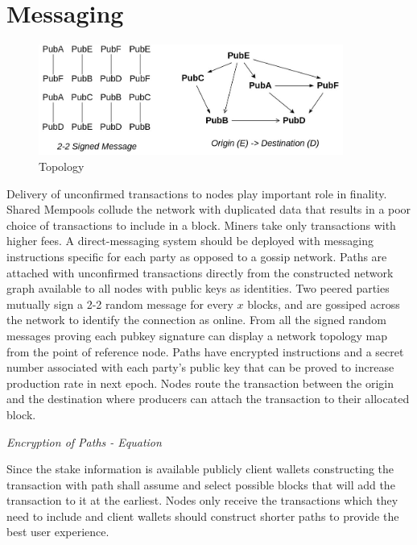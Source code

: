 \documentclass[a4paper,10pt]{article}
\begin{document}
\section{Messaging}
\begin{figure}[H]
\begin{center}
\includegraphics[width=10cm]{topology}
\caption{Topology}
\end{center}
\end{figure}
Delivery of unconfirmed transactions to nodes play important role in finality. Shared Mempools collude the network with duplicated data that results in a poor choice of transactions to include in a block. Miners take only transactions with higher fees. A direct-messaging system should be deployed with messaging instructions specific for each party as opposed to a gossip network. Paths are attached with unconfirmed transactions directly from the constructed network graph available to all nodes with public keys as identities. Two peered parties mutually sign a 2-2 random message for every $x$ blocks, and are gossiped across the network to identify the connection as online. From all the signed random messages proving each pubkey signature can display a network topology map from the point of reference node. 
Paths have encrypted instructions and a secret number associated with each party's public key that can be proved to increase production rate in next epoch. Nodes route the transaction between the origin and the destination where producers can attach the transaction to their allocated block. 

\textit{Encryption of Paths - Equation}

Since the stake information is available publicly client wallets constructing the transaction with path shall assume and select possible blocks that will add the transaction to it at the earliest. Nodes only receive the transactions which they need to include and client wallets should construct shorter paths to provide the best user experience.
\end{document}
